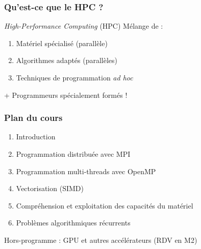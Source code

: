 \documentclass[xcolor={x11names,svgnames}]{beamer}
\begin{document}
 

\begin{frame}
\frametitle{Qu'est-ce que le HPC ?}


\begin{alertblock}{\emph{High-Performance Computing} (HPC)}
  Mélange de :
  \begin{enumerate}
  \item Matériel spécialisé (parallèle)
  \item Algorithmes adaptés (parallèles)
  \item Techniques de programmation \textit{ad hoc}
  \end{enumerate}
\end{alertblock}

\medskip

+ Programmeurs spécialement formés !

\end{frame}


 

\begin{frame}
  \frametitle{Plan du cours}
  
  \begin{enumerate}%
  \item Introduction
  \item Programmation distribuée avec MPI
  \item Programmation multi-threads avec OpenMP
  \item Vectorisation (SIMD)    
  \item Compréhension et exploitation des capacités du matériel
  \item Problèmes algorithmiques récurrents
  \end{enumerate}

  \bigskip
  
  \alert{Hors-programme : GPU et autres accélérateurs} (RDV en M2)
\end{frame}







\end{document}
